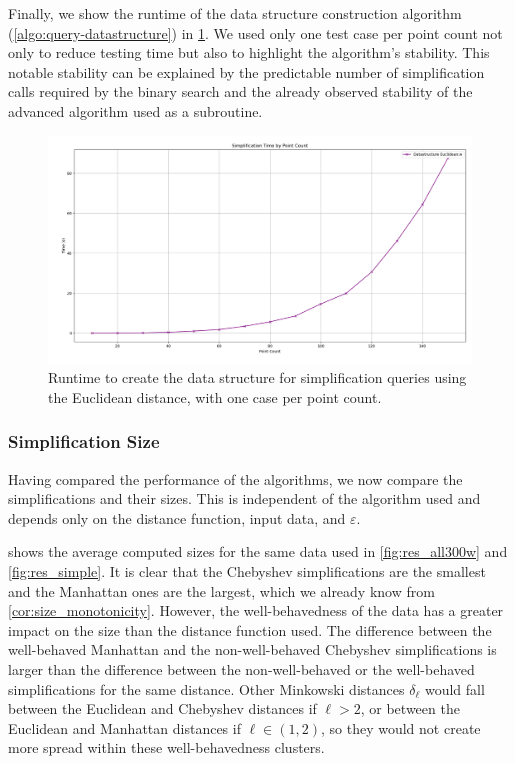 Finally, we show the runtime of the data structure construction algorithm (\cref{algo:query-datastructure}) in \cref{fig:res_ds}. We used only one test case per point count not only to reduce testing time but also to highlight the algorithm's stability. This notable stability can be explained by the predictable number of simplification calls required by the binary search and the already observed stability of the advanced algorithm used as a subroutine.

\begin{figure}[b]
  \centering
	\includegraphics[scale=0.4]{./figures/res_ds.png}
  \caption{Runtime to create the data structure for simplification queries using the Euclidean distance, with one case per point count.}
  \label{fig:res_ds}
\end{figure}

\subsubsection{Simplification Size}
\label{ssubsec:simplification_size}
Having compared the performance of the algorithms, we now compare the simplifications and their sizes. This is independent of the algorithm used and depends only on the distance function, input data, and \(\varepsilon\).

 shows the average computed sizes for the same data used in \cref{fig:res_all300w} and \cref{fig:res_simple}. It is clear that the Chebyshev simplifications are the smallest and the Manhattan ones are the largest, which we already know from \cref{cor:size_monotonicity}. However, the well-behavedness of the data has a greater impact on the size than the distance function used. The difference between the well-behaved Manhattan and the non-well-behaved Chebyshev simplifications is larger than the difference between the non-well-behaved or the well-behaved simplifications for the same distance. Other Minkowski distances \(\delta_\ell\) would fall between the Euclidean and Chebyshev distances if \(\ell > 2\), or between the Euclidean and Manhattan distances if \(\ell \in (1,2)\), so they would not create more spread within these well-behavedness clusters.

